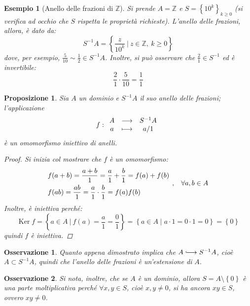 \documentclass[12pt]{scrartcl}
\theoremstyle{style}
\newtheorem{esempio}{Esempio}[section]
\newtheorem{prop}{Proposizione}[section]
\newtheorem{osservazione}{Osservazione}[section]
\numberwithin{equation}{subsection}
\newcommand{\longhookrightarrow}{\lhook\joinrel\longrightarrow}
\begin{document}
\begin{esempio}
	[Anello delle frazioni di $\mathbb{Z}$]
	Si prende $A = \mathbb{Z}$ e $S = \left\{ 10^k \right\} _{k\ge 0} $ (si verifica ad occhio che $S$ rispetta le propriet\`a richieste).
	L'anello delle frazioni, allora, \`e dato da:
	\[
	S^{-1} A = \left\{ \frac{z}{10^k} \ \Big\lvert \ z \in \mathbb{Z}, \ k\ge 0 \right\} 
	\] 
	dove, per esempio, $\displaystyle \frac{5}{10}\sim \frac{1}{2} \in S^{-1}A$.
	Inoltre, si pu\`o osservare che $\displaystyle \frac{2}{1} \in S^{-1}$ ed \`e invertibile:
	\[
	\frac{2}{1}\cdot \frac{5}{10} = \frac{1}{1}
	\] 
\end{esempio}
\begin{prop}\label{aext}
	Sia $A$ un dominio e $S ^{-1}A$ il suo anello delle frazioni; l'applicazione
	\[
f : 
		\begin{array}
			{c c c}
			A &\longrightarrow& S^{-1}A\\
			a &\longmapsto & a / 1
		\end{array}
	\] 
	\`e un omomorfismo iniettivo di anelli.
	\begin{proof}
		Si inizia col mostrare che $f$ \`e un omomorfismo:
		\[
			\begin{split}
				&f(a + b) = \frac{a+b}{1} = \frac{a}{1}+\frac{b}{1} = f(a) + f(b) \\
				&f(ab)  = \frac{ab}{1} = \frac{a}{1} \cdot \frac{b}{1} = f(a) f(b)
			\end{split} \hspace{.15cm} , \hspace{.3cm} \forall a,b \in A
		\] 
	Inoltre, \`e iniettiva perch\'e:
	\[
	\operatorname{Ker} f = \left\{ a \in  A \ \Big\lvert \ f(a) = \frac{a}{1} = \frac{0}{1} \right\} = \left\{ a \in A  \mid a \cdot 1 = 0\cdot 1 = 0 \right\} = \left\{ 0 \right\} 
	\] 
	quindi $f$ \`e iniettiva.
	\end{proof}
\end{prop}
\begin{osservazione}
Quanto appena dimostrato implica che $A \longhookrightarrow  S^{-1}A$, cio\`e $A \subset S^{-1}A$, quindi che l'anello delle frazioni \`e un'estensione di $A$.
\end{osservazione}
\begin{osservazione}
Si nota, inoltre, che se $A$ \`e un dominio, allora $S = A \setminus\left\{ 0 \right\} $ \`e una parte moltiplicativa perch\'e $\forall x,y \in S$, cio\`e $x,y\neq 0$, si ha ancora $xy \in S$, ovvero $xy \neq 0$.
\end{osservazione}
\end{document}
